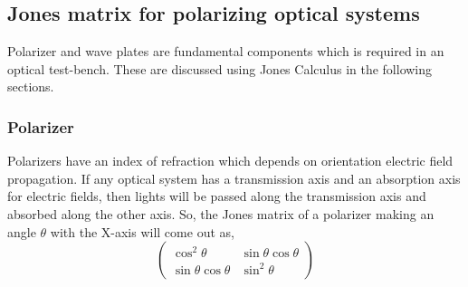 \documentclass[../report.tex]{subfiles}
\begin{document}
			\subsection{Jones matrix for polarizing optical systems}
Polarizer and wave plates are fundamental components which is required in an optical test-bench. These are discussed using Jones Calculus in the following sections.
		\subsubsection{Polarizer}
Polarizers have an index of refraction which depends on orientation electric field propagation. If any optical system has a transmission axis and an absorption axis for electric fields, then lights will be passed along the transmission axis and absorbed along the other axis. So, the Jones matrix of a polarizer making an angle $\theta$ with the X-axis will come out as,
\begin{equation}\label{eq:jones_matrix_polarizer}
\left(\begin{matrix} 
\cos ^{2}\theta & \sin \theta \cos \theta \\ 
\sin \theta \cos \theta & \sin ^{2}\theta
\end{matrix} \right) 
\end{equation} 
\end{document}
